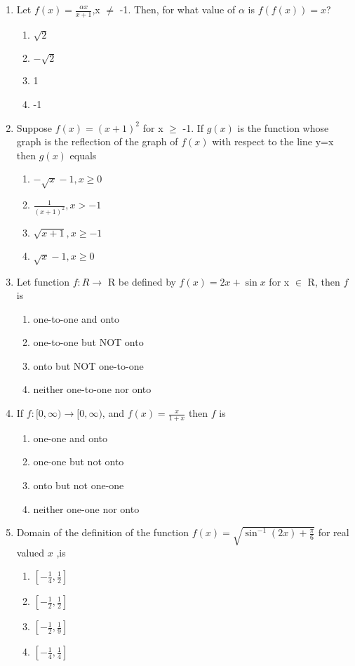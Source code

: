 \begin{enumerate}[label=\arabic*.,ref=\thesubsection.\theenumi]
\item Let $f(x)=\frac{\alpha x}{x+1}$,x $\neq$ -1. Then, for what value of $\alpha$ is $f(f(x))=x$?
\begin{enumerate}
\item $\sqrt{2}$
\item $-\sqrt{2}$
\item 1
\item -1
\end{enumerate} 

\item Suppose $f(x)=(x+1)^2$ for x $\geq$ -1. If $g(x)$ is the function whose graph is the reflection of the  graph of $f(x)$ with respect to the line y=x then $g(x)$ equals
\begin{enumerate}
\item $-\sqrt{x}-1, x \geq 0$
\item $\frac{1}{(x+1)^{2}}, x > -1$
\item $\sqrt{x+1}, x\geq-1$
\item $\sqrt{x}-1, x\geq0$
\end{enumerate}

\item Let function $f: R \rightarrow$ R be defined by $f(x) = 2x+\sin x$ for x $\in$ R, then $f$ is
\begin{enumerate}
\item one-to-one and onto
\item one-to-one but NOT onto
\item onto but NOT one-to-one
\item neither one-to-one nor onto
\end{enumerate}

\item If $f: [0,\infty) \rightarrow [0,\infty)$, and $f(x)=\frac{x}{1+x}$ then $f$ is
\begin{enumerate}
\item one-one and onto
\item one-one but not onto
\item onto but not one-one
\item neither one-one nor onto
\end{enumerate}

\item Domain of the definition of the function $f(x)=\sqrt{\sin^{-1}(2x)+\frac{\pi}{6}}$ for real valued $x$ ,is
\begin{enumerate}
\item $[-\frac{1}{4},\frac{1}{2}]$
\item $[-\frac{1}{2},\frac{1}{2}]$
\item $[-\frac{1}{2},\frac{1}{9}]$
\item $[-\frac{1}{4},\frac{1}{4}]$
\end{enumerate}


\end{enumerate}
